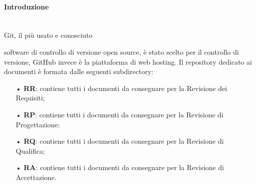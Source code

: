 \paragraph{Introduzione}\mbox{}\\
Git, il più usato e conosciuto {software di controllo di {versione} open source, è stato scelto per il controllo di versione, GitHub invece è la piattaforma di web hosting. 
\newline
Il repository dedicato ai documenti è formata dalle seguenti subdirectory:
\begin{itemize}
\item[•] \textbf{RR}: contiene tutti i documenti da consegnare per la Revisione dei Requisiti;
\item[•] \textbf{RP}: contiene tutti i documenti da consegnare per la Revisione di Progettazione;
\item[•] \textbf{RQ}: contiene tutti i documenti da consegnare per la Revisione di Qualifica;
\item[•] \textbf{RA}: contiene tutti i documenti da consegnare per la Revisione di Accettazione.
\end{itemize}


}
